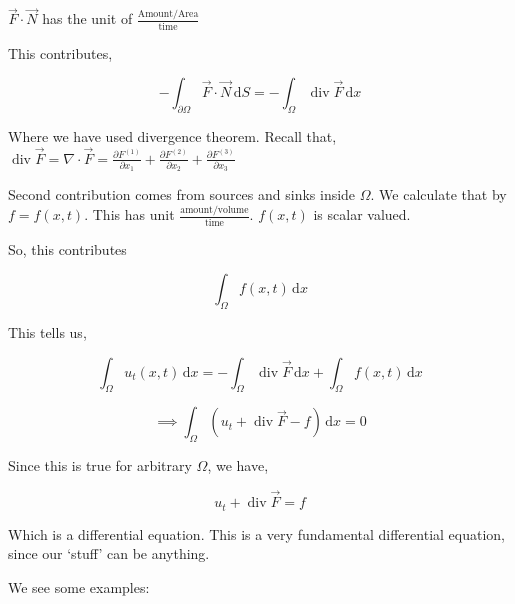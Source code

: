 \documentclass{article}
\theoremstyle{definition}
\begin{document}
\(\vec{F} \cdot \vec{N} \) has the unit of \(\frac{\text{Amount}/\text{Area}}{\text{time}}\) 

This contributes,

\[
    -\int_{\partial \Omega }^{} \vec{F} \cdot \vec{N}  \,\mathrm{d}S = -\int_{\Omega }^{} \operatorname{div} \vec{F} \,\mathrm{d}x 
\]

Where we have used divergence theorem. Recall that, \(\displaystyle \operatorname{div} \vec{F} = \nabla \cdot \vec{F} = \frac{\partial F^{(1)}}{\partial x_1} + \frac{\partial F^{(2)}}{\partial x_2} + \frac{\partial F^{(3)}}{\partial x_3} \) 

Second contribution comes from sources and sinks inside \(\Omega \). We calculate that by \(f = f(x,t)\). This has unit \(\frac{\text{amount}/\text{volume} }{\text{time}}\). \(f(x,t)\) is scalar valued.

So, this contributes

\[
    \int_{\Omega }^{} f(x,t) \,\mathrm{d}x 
\]

This tells us,

\[
    \int_{\Omega }^{} u_t(x,t) \,\mathrm{d}x = - \int_{\Omega }^{} \operatorname{div} \vec{F} \,\mathrm{d}x + \int_{\Omega }^{} f(x,t) \,\mathrm{d}x 
\]

\[
    \implies \int_{\Omega }^{} (u_t + \operatorname{div} \vec{F} -f) \,\mathrm{d}x = 0
\]

Since this is true for arbitrary \(\Omega \), we have,

\[
    u_t + \operatorname{div} \vec{F} = f 
\]

Which is a differential equation. This is a very fundamental differential equation, since our `stuff' can be anything.

We see some examples:
\end{document}

